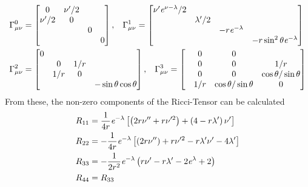 \begin{align}
	\Gamma_{\mu\nu}^0 &= \begin{bmatrix}
	                     	0 & \nu'/2 & & \\
	                     	\nu'/2 & 0 & & \\
	                     	& & 0 &\\
	                     	& & & 0
	                     \end{bmatrix}, \hspace{0.3cm}
	\Gamma_{\mu\nu}^1 = \begin{bmatrix}
	                     	\nu'\mathit{e}^{\nu-\lambda}/2 & & &\\
	                     	& \lambda'/2 & & \\
	                     	& & -r\mathit{e}^{-\lambda} & \\
	                     	& & & -r\sin^2\theta\mathit{e}^{-\lambda}
	                     \end{bmatrix}\\
	\Gamma_{\mu\nu}^2 &= \begin{bmatrix}
	                     	0 & & &\\
	                     	& 0 & 1/r &\\
	                     	& 1/r & 0 &\\
	                     	& & & -\sin\theta\cos\theta
	                     \end{bmatrix}, \hspace{0.3cm}
	\Gamma_{\mu\nu}^3 = \begin{bmatrix}
	                     	& 0 & 0 &\\
	                     	& 0 & 0 & 1/r\\
	                     	& 0 & 0 & \cos\theta/\sin\theta\\
	                     	& 1/r & \cos\theta/\sin\theta & 0
						\end{bmatrix}
\end{align}
From these, the non-zero components of the Ricci-Tensor can be calculated 
\begin{align}
	R_{11} &= \frac{1}{4r}\mathit{e}^{-\lambda}\left[\left(2r\nu''+r\nu'^2\right) + \left(4-r\lambda'\right)\nu'\right]\\
	R_{22} &= -\frac{1}{4r}\mathit{e}^{-\lambda}\left[\left(2r\nu''\right)+r\nu'^2-r\lambda'\nu'-4\lambda'\right]\\
	R_{33} &= -\frac{1}{2r^2}\mathit{e}^{-\lambda}\left(r\nu'-r\lambda'-2\mathit{e}^\lambda+2\right)\\
	R_{44} &= R_{33}
\end{align}
